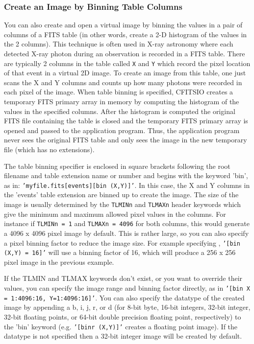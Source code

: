 \documentclass[11pt]{article}
\begin{document}
\subsubsection{Create an Image by Binning Table Columns}

You can also create and open a virtual image by binning the values in a
pair of columns of a FITS table (in other words, create a 2-D histogram
of the values in the 2 columns).  This technique is often used in X-ray
astronomy where each detected X-ray photon during an observation is
recorded in a FITS table.  There are typically 2 columns in the table
called  {\tt X} and {\tt Y} which record the pixel location of that
event in a virtual 2D image.  To create an image from this table, one
just scans the X and Y columns and counts up how many photons were
recorded in each pixel of the image.  When table binning is specified,
CFITSIO creates a temporary FITS primary array in memory by computing
the histogram of the values in the specified columns.  After the
histogram is computed the original FITS file containing the table is
closed and the temporary FITS primary array is opened and passed to the
application program.  Thus, the application program never sees the
original FITS table and only sees the image in the new temporary file
(which has no extensions).

The table binning specifier is enclosed in square brackets following
the root filename and table extension name or number and begins with
the keyword 'bin', as in: \newline
{\tt 'myfile.fits[events][bin (X,Y)]'}. In
this case, the X and Y columns in the 'events' table extension are
binned up to create the image.  The size of the image is usually
determined by the {\tt TLMINn} and {\tt TLMAXn} header keywords which
give the minimum and maximum allowed pixel values in the columns.  For
instance if {\tt TLMINn = 1} and {\tt TLMAXn = 4096} for both columns, this would
generate a 4096 x 4096 pixel image by default.  This is rather large,
so you can also specify a pixel binning factor to reduce the image
size.  For example specifying ,  {\tt '[bin (X,Y) = 16]'} will use a
binning factor of 16, which will produce a 256 x 256 pixel image in the
previous example.

If the TLMIN and TLMAX keywords don't exist, or you want to override
their values,  you can specify the image range and binning factor
directly, as in {\tt '[bin X = 1:4096:16, Y=1:4096:16]'}.  You can also
specify the datatype of the created image by appending a b, i, j, r, or
d (for 8-bit byte, 16-bit integers, 32-bit integer, 32-bit floating
points, or 64-bit double precision floating point, respectively)  to
the 'bin' keyword (e.g. {\tt '[binr (X,Y)]'} creates a floating point
image).  If the datatype is not specified then a 32-bit integer image
will be created by default.
\end{document}
